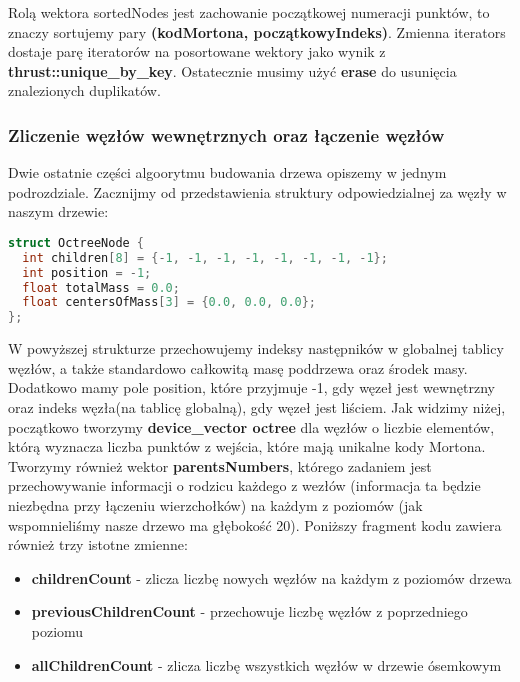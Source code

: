 \documentclass[14pt,twoside,a4paper]{article}
\theoremstyle{definition}
\begin{document}
Rolą wektora sortedNodes jest zachowanie początkowej numeracji punktów, to znaczy sortujemy pary \textbf{(kodMortona, początkowyIndeks)}.
Zmienna iterators dostaje parę iteratorów na posortowane wektory jako wynik z \textbf{thrust::unique\_by\_key}. Ostatecznie musimy użyć \textbf{erase} do usunięcia znalezionych duplikatów.

\subsubsection{\large Zliczenie węzłów wewnętrznych oraz łączenie węzłów}

Dwie ostatnie części algoorytmu budowania drzewa opiszemy w jednym podrozdziale.
Zacznijmy od przedstawienia struktury odpowiedzialnej za węzły w naszym drzewie:

\begin{lstlisting}[language=C++, frame=single, framerule=2pt, caption=Struktura OctreeNode]
struct OctreeNode {
  int children[8] = {-1, -1, -1, -1, -1, -1, -1, -1};
  int position = -1;
  float totalMass = 0.0;
  float centersOfMass[3] = {0.0, 0.0, 0.0};
};
\end{lstlisting}
W powyższej strukturze przechowujemy indeksy następników w globalnej tablicy węzłów, a także standardowo całkowitą masę poddrzewa oraz środek masy. Dodatkowo mamy pole position, które przyjmuje -1, gdy węzeł jest wewnętrzny oraz indeks węzła(na tablicę globalną), gdy węzeł jest liściem.
Jak widzimy niżej, początkowo tworzymy \textbf{device\_vector octree} dla węzłów o liczbie elementów, którą wyznacza liczba punktów z wejścia, które mają unikalne kody Mortona. \\
Tworzymy również wektor \textbf{parentsNumbers}, którego zadaniem jest przechowywanie informacji o rodzicu każdego z wezłów (informacja ta będzie niezbędna przy łączeniu wierzchołków) na każdym z poziomów (jak wspomnieliśmy nasze drzewo ma głębokość 20). Poniższy fragment kodu zawiera również trzy istotne zmienne:
\begin{itemize}
\item \textbf{childrenCount} - zlicza liczbę nowych węzłów na każdym z poziomów drzewa
\item \textbf{previousChildrenCount} - przechowuje liczbę węzłów z poprzedniego poziomu
\item \textbf{allChildrenCount} - zlicza liczbę wszystkich węzłów w drzewie ósemkowym
\end{itemize}
\end{document}
